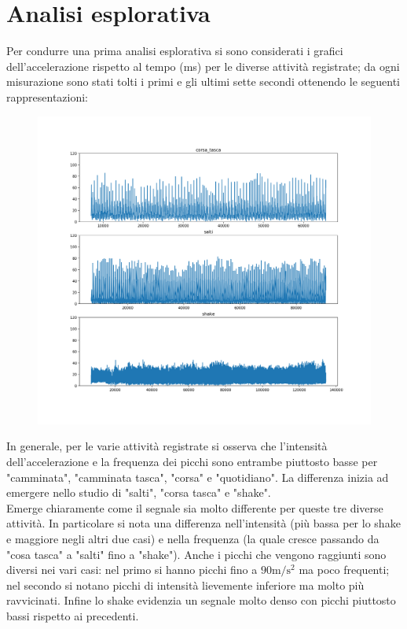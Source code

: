 \documentclass[./main.tex]{subfiles}
\begin{document}
\section{Analisi esplorativa}
Per condurre una prima analisi esplorativa si sono considerati i grafici dell'accelerazione rispetto al tempo (ms) per le diverse attività registrate; da ogni misurazione sono stati tolti i primi e gli ultimi sette secondi ottenendo le seguenti rappresentazioni:
\begin{figure}[H]
	\centering
	\includegraphics[width=.8\textwidth, keepaspectratio]{../../figure/espl.png}
	\caption{{}}
	\label{espl}
\end{figure}
In generale, per le varie attività registrate si osserva che l'intensità dell'accelerazione e la frequenza dei picchi sono entrambe piuttosto basse per "camminata", "camminata tasca", "corsa" e "quotidiano". La differenza inizia ad emergere nello studio di "salti", "corsa tasca" e "shake".\\
Emerge chiaramente come il segnale sia molto differente per queste tre diverse attività. In particolare si nota
una differenza nell'intensità (più bassa per lo shake e maggiore negli altri due casi) e nella frequenza (la quale cresce passando da "cosa tasca" a "salti" fino a "shake"). Anche i picchi che vengono raggiunti sono diversi nei vari casi: nel primo si hanno picchi fino a $90\si{\metre\per\square\second}$ ma poco frequenti; nel secondo si notano picchi di intensità lievemente inferiore ma molto più ravvicinati. Infine lo shake evidenzia un segnale molto denso con  picchi piuttosto bassi rispetto ai precedenti.\\
\end{document}
